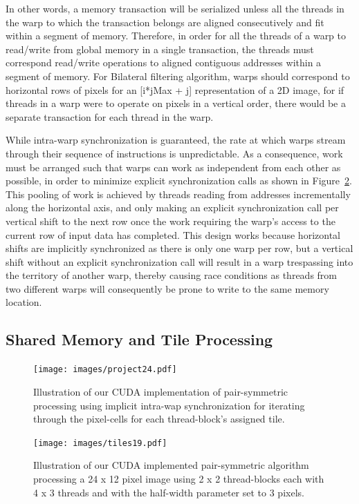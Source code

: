 \documentclass{IEEEtran}
\begin{document}
In other words, a memory transaction will be serialized unless all the threads in the warp to which the transaction belongs are aligned consecutively and fit within a segment of memory. Therefore, in order for all the threads of a warp to read/write from global memory in a single transaction, the threads must correspond read/write operations to aligned contiguous addresses within a segment of memory. For Bilateral filtering algorithm, warps should correspond to horizontal rows of pixels for an [i*jMax + j] representation of a 2D image, for if threads in a warp were to operate on pixels in a vertical order, there would be a separate transaction for each thread in the warp.

While intra-warp synchronization is guaranteed, the rate at which warps stream through their sequence of instructions is unpredictable. As a consequence, work must be arranged such that warps can work as independent from each other as possible, in order to minimize explicit synchronization calls as shown in Figure~\ref{fig:pspro}. This pooling of work is achieved by threads reading from addresses incrementally along the horizontal axis, and only making an explicit synchronization call per vertical shift to the next row once the work requiring the warp's access to the current row of input data has completed. This design works because horizontal shifts are implicitly synchronized as there is only one warp per row, but a vertical shift without an explicit synchronization call will result in a warp trespassing into the territory of another warp, thereby causing race conditions as threads from two different warps will consequently be prone to write to the same memory location. 

\subsection{Shared Memory and Tile Processing}
\begin{figure}
\texttt{[image: images/project24.pdf]}
\caption{Illustration of our CUDA implementation of pair-symmetric processing using implicit intra-wap synchronization for iterating through the pixel-cells for each thread-block's assigned tile.}
\label{fig:pspro}
\end{figure}

\begin{figure}
\texttt{[image: images/tiles19.pdf]}
\caption{Illustration of our CUDA implemented pair-symmetric algorithm processing a 24 x 12 pixel image using 2 x 2 thread-blocks each with 4 x 3 threads and with the half-width parameter set to 3 pixels.}
\label{fig:pspro}
\end{figure}
\end{document}
